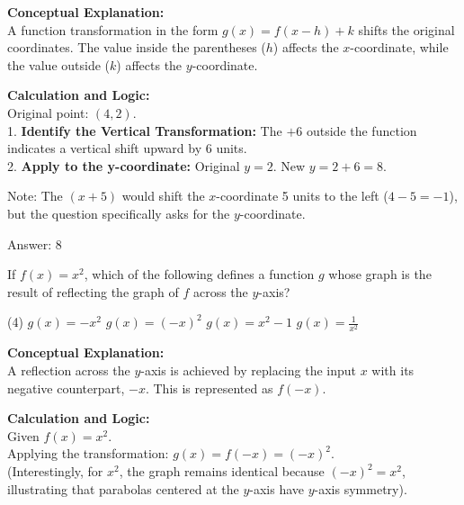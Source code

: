 \documentclass[11pt,paper=a4,answers]{exam}
\begin{document}
\begin{questions}
\begin{solution}
\textbf{Conceptual Explanation:} \\
A function transformation in the form $g(x) = f(x-h) + k$ shifts the original coordinates. The value inside the parentheses ($h$) affects the $x$-coordinate, while the value outside ($k$) affects the $y$-coordinate.

\vspace{20pt}

\textbf{Calculation and Logic:} \\
Original point: $(4, 2)$. \\
1. \textbf{Identify the Vertical Transformation:} The $+6$ outside the function indicates a vertical shift upward by 6 units. \\
2. \textbf{Apply to the y-coordinate:} Original $y = 2$. New $y = 2 + 6 = 8$.

\vspace{10pt}

Note: The $(x+5)$ would shift the $x$-coordinate 5 units to the left ($4 - 5 = -1$), but the question specifically asks for the $y$-coordinate.

\vspace{25pt}

Answer: \colorbox{yellow!100}{8}
\end{solution}

\vspace{40pt}

\question
If $f(x) = x^2$, which of the following defines a function $g$ whose graph is the result of reflecting the graph of $f$ across the $y$-axis?
\begin{tasks}(4)
    \task $g(x) = -x^2$
    \task $g(x) = (-x)^2$
    \task $g(x) = x^2 - 1$
    \task $g(x) = \frac{1}{x^2}$
\end{tasks}

\begin{solution}
\textbf{Conceptual Explanation:} \\
A reflection across the $y$-axis is achieved by replacing the input $x$ with its negative counterpart, $-x$. This is represented as $f(-x)$.

\vspace{20pt}

\textbf{Calculation and Logic:} \\
Given $f(x) = x^2$. \\
Applying the transformation: $g(x) = f(-x) = (-x)^2$. \\
(Interestingly, for $x^2$, the graph remains identical because $(-x)^2 = x^2$, illustrating that parabolas centered at the $y$-axis have $y$-axis symmetry).


\end{solution}
\end{questions}
\end{document}
